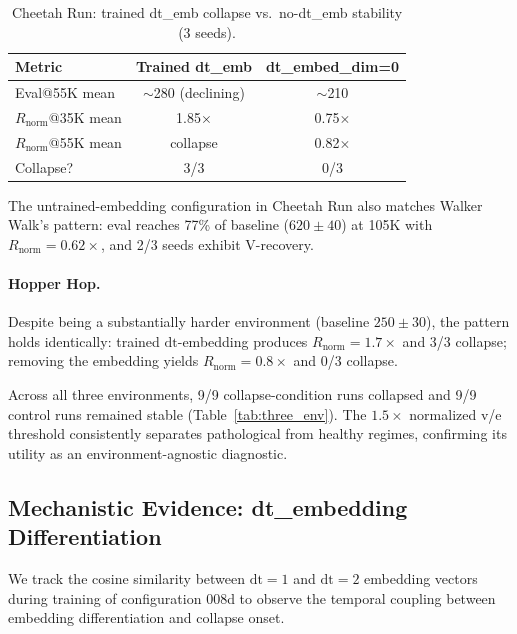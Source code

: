 \documentclass[10pt,letterpaper]{article}
\begin{document}
\begin{table}[h]
\centering
\caption{Cheetah Run: trained dt\_emb collapse vs.\ no-dt\_emb stability (3 seeds).}
\label{tab:cheetah_collapse}
\begin{tabular}{lcc}
\toprule
\textbf{Metric} & \textbf{Trained dt\_emb} & \textbf{dt\_embed\_dim=0} \\
\midrule
Eval@55K mean & $\sim$280 (declining) & $\sim$210 \\
$R_{\text{norm}}$@35K mean & 1.85$\times$ & 0.75$\times$ \\
$R_{\text{norm}}$@55K mean & collapse & 0.82$\times$ \\
Collapse? & 3/3 & 0/3 \\
\bottomrule
\end{tabular}
\label{tab:cheetah_nodt}
\end{table}

The untrained-embedding configuration in Cheetah Run also matches Walker Walk's pattern: eval reaches 77\% of baseline ($620 \pm 40$) at 105K with $R_{\text{norm}} = 0.62\times$, and 2/3 seeds exhibit V-recovery.

\paragraph{Hopper Hop.} Despite being a substantially harder environment (baseline $250 \pm 30$), the pattern holds identically: trained $\mathrm{dt}$-embedding produces $R_{\text{norm}} = 1.7\times$ and 3/3 collapse; removing the embedding yields $R_{\text{norm}} = 0.8\times$ and 0/3 collapse.

Across all three environments, 9/9 collapse-condition runs collapsed and 9/9 control runs remained stable (Table~\ref{tab:three_env}). The $1.5\times$ normalized v/e threshold consistently separates pathological from healthy regimes, confirming its utility as an environment-agnostic diagnostic.


\subsection{Mechanistic Evidence: dt\_embedding Differentiation}
\label{sec:cosine}

We track the cosine similarity between $\mathrm{dt}{=}1$ and $\mathrm{dt}{=}2$ embedding vectors during training of configuration 008d to observe the temporal coupling between embedding differentiation and collapse onset.
\end{document}
